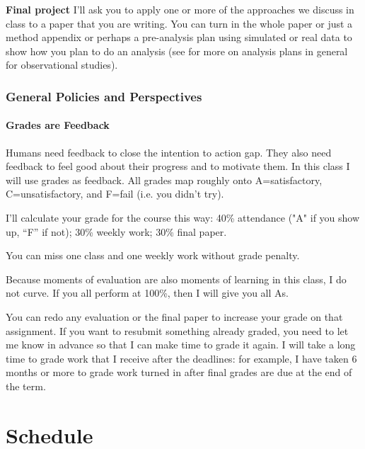 \documentclass[10pt]{article}
\newenvironment{introstuff} {\setcounter{secnumdepth}{0}} {\setcounter{secnumdepth}{1}}
\begin{document}
\begin{introstuff}
	\textbf{Final project} I'll ask you to apply one or more of the
	approaches we discuss in class to a paper that you are writing. You can
	turn in the whole paper or just a method appendix or perhaps a
	pre-analysis plan using simulated or real data to show how you plan to
	do an analysis (see \cite[Chap 23 on Planning]{rosenbaum2020book} for
	more on analysis plans in general for observational studies).

        \section{General Policies and Perspectives}

        \subsection{Grades are Feedback}

        Humans need feedback to close the intention to action gap. They also need
        feedback to feel good about their progress and to motivate them. In this
        class I will use grades as feedback. All grades map roughly onto A=satisfactory,
        C=unsatisfactory, and F=fail (i.e. you didn't try).

        I'll calculate your grade for the course this way: 40\% attendance  ("A" if you show up,
        ``F'' if not); 30\% weekly work; 30\% final paper.

        You can miss one class and one weekly work without grade penalty.

        Because moments of evaluation are also moments of learning in this
        class, I do not curve. If you all perform at 100\%, then I will give
        you all As.

	You can redo any  evaluation or the final paper to increase your grade
	on that  assignment. If you want to resubmit something already graded,
	you need  to let me know  in advance so that I can make  time to grade
	it again. I will take a long time to grade work that I receive after
	the deadlines: for example, I have taken 6 months or more to grade work
	turned in after final grades are due at the end of the term.

 \end{introstuff}

 \part*{Schedule}
\end{document}
